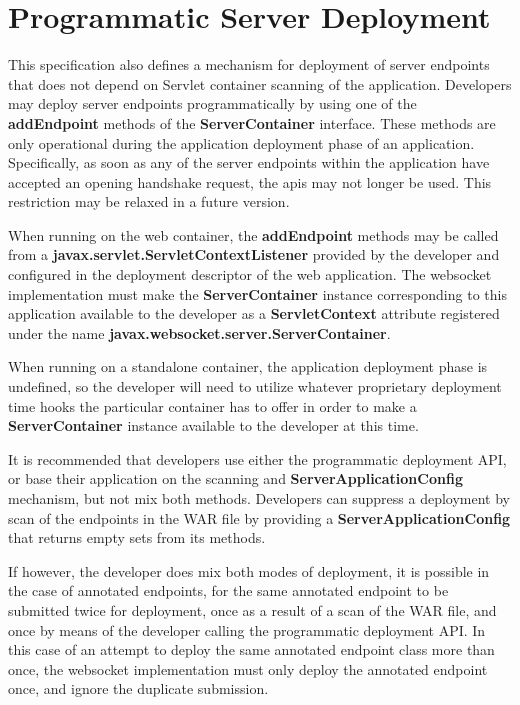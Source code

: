 \section{Programmatic Server Deployment}

This specification also defines a mechanism for deployment of server endpoints that does not depend on Servlet container scanning of the application. Developers may deploy server endpoints programmatically by using one of the \textbf{addEndpoint} methods of the \textbf{ServerContainer} interface. These methods are only operational during the application deployment phase of an application. Specifically, as soon as any of the server endpoints within the application have accepted an opening handshake request, the apis may not longer be used. This restriction may be relaxed in a future version.

When running on the web container, the \textbf{addEndpoint} methods may be called from a \textbf{javax.servlet.ServletContextListener} provided by the developer and configured in the deployment descriptor of the web application. The websocket implementation must make the \textbf{ServerContainer} instance corresponding to this application available to the developer as a \textbf{ServletContext} attribute registered under the name \textbf{javax.websocket.server.ServerContainer}.

 When running on a standalone container, the application deployment phase is undefined, so the developer will need to utilize whatever proprietary deployment time hooks the particular container has to offer in order to make a \textbf{ServerContainer} instance available to the developer at this time.
 
 It is recommended that developers use either the programmatic deployment API, or base their application on the scanning and \textbf{ServerApplicationConfig} mechanism, but not mix both methods. Developers can suppress a deployment by scan of the endpoints in the WAR file by providing a \textbf{ServerApplicationConfig} that returns empty sets from its methods.
 
 If however, the developer does mix both modes of deployment, it is possible in the case of annotated endpoints, for the same annotated endpoint to be submitted twice for deployment, once as a result of a scan of the WAR file, and once by means of the developer calling the programmatic deployment API. In this case of an attempt to deploy the same annotated endpoint class more than once, the websocket implementation must only deploy the annotated endpoint once, and ignore the duplicate submission.

